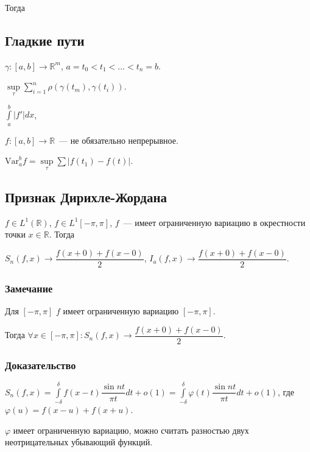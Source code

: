\documentclass{article}
\begin{document}
        Тогда
        
    \subsection{Гладкие пути}
    
        $\gamma : [a, b] \rightarrow \mathbb{R}^m$, $a = t_0 < t_1 < \ldots < t_n = b$.
        
        $\sup\limits_{\tau} \sum\limits^n_{i = 1} \rho(\gamma(t_m), \gamma(t_i))$.
        
        $\int\limits^b_a |f'| dx$,
        
        $f : [a, b] \rightarrow \mathbb{R}$~--- не обязательно непрерывное.
        
        $\mathrm{Var}^b_a f = \sup\limits_{\tau} \sum | f(t_1) - f(t) |$.
        
    \subsection{Признак Дирихле-Жордана}
    
        $f \in L^1 ( \mathbb{R} )$, $f \in L^1 [-\pi, \pi]$, $f$~--- имеет ограниченную вариацию в окрестности точки $x \in \mathbb{R}$. Тогда
        
        $S_n(f, x) \rightarrow \dfrac{f(x + 0) + f(x - 0)}{2}$, $I_a(f, x) \rightarrow \dfrac{f(x + 0) + f(x - 0)}{2}$.
        
        \subsubsection{Замечание}
        
            Для $[-\pi, \pi]$ $f$ имеет ограниченную вариацию $[-\pi, \pi]$.
            
            Тогда $\forall x \in [-\pi, \pi] : S_n(f, x) \rightarrow \dfrac{f(x + 0) + f(x - 0)}{2}$.
            
        \subsubsection{Доказательство}
        
            $S_n(f, x) = \int\limits^{\delta}_{-\delta} f(x - t) \dfrac{\sin nt}{\pi t} dt + o(1) = \int\limits^{\delta}_{-\delta} \varphi(t) \dfrac{\sin nt}{\pi t} dt + o(1)$, где $\varphi(u) = f(x - u) + f(x + u)$.
            
            $\varphi$ имеет ограниченную вариацию, можно считать разностью двух неотрицательных убывающий функций.
            
\end{document}

